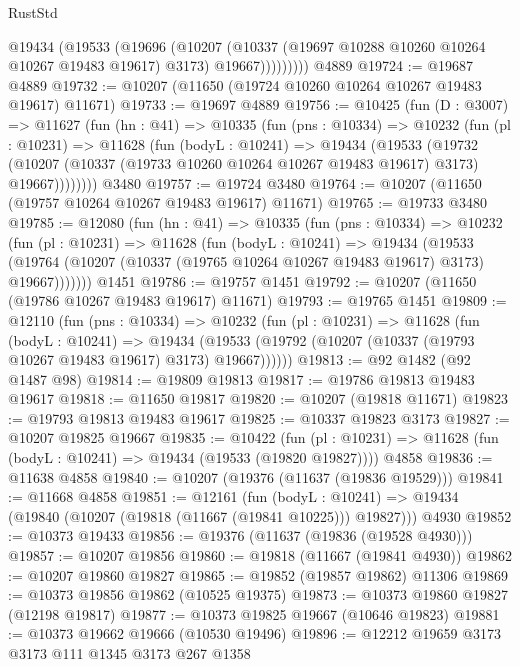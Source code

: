 \begin{lexlean}{RustStd}
\begin{coremodule}
              @19434
                (@19533
                  (@19696
                    (@10207
                      (@10337 (@19697 @10288 @10260 @10264 @10267 @19483 @19617) @3173)
                      @19667)))))))))
    @4889
@19724 := @19687 @4889
@19732 := @10207 (@11650 (@19724 @10260 @10264 @10267 @19483 @19617) @11671)
@19733 := @19697 @4889
@19756 := @10425
    (fun (D : @3007) =>
    @11627
      (fun (hn : @41) =>
      @10335
        (fun (pns : @10334) =>
        @10232
          (fun (pl : @10231) =>
          @11628
            (fun (bodyL : @10241) =>
            @19434
              (@19533
                (@19732
                  (@10207 (@10337 (@19733 @10260 @10264 @10267 @19483 @19617) @3173) @19667))))))))
    @3480
@19757 := @19724 @3480
@19764 := @10207 (@11650 (@19757 @10264 @10267 @19483 @19617) @11671)
@19765 := @19733 @3480
@19785 := @12080
    (fun (hn : @41) =>
    @10335
      (fun (pns : @10334) =>
      @10232
        (fun (pl : @10231) =>
        @11628
          (fun (bodyL : @10241) =>
          @19434
            (@19533
              (@19764 (@10207 (@10337 (@19765 @10264 @10267 @19483 @19617) @3173) @19667)))))))
    @1451
@19786 := @19757 @1451
@19792 := @10207 (@11650 (@19786 @10267 @19483 @19617) @11671)
@19793 := @19765 @1451
@19809 := @12110
    (fun (pns : @10334) =>
    @10232
      (fun (pl : @10231) =>
      @11628
        (fun (bodyL : @10241) =>
        @19434 (@19533 (@19792 (@10207 (@10337 (@19793 @10267 @19483 @19617) @3173) @19667))))))
@19813 := @92 @1482 (@92 @1487 @98)
@19814 := @19809 @19813
@19817 := @19786 @19813 @19483 @19617
@19818 := @11650 @19817
@19820 := @10207 (@19818 @11671)
@19823 := @19793 @19813 @19483 @19617
@19825 := @10337 @19823 @3173
@19827 := @10207 @19825 @19667
@19835 := @10422
    (fun (pl : @10231) => @11628 (fun (bodyL : @10241) => @19434 (@19533 (@19820 @19827))))
    @4858
@19836 := @11638 @4858
@19840 := @10207 (@19376 (@11637 (@19836 @19529)))
@19841 := @11668 @4858
@19851 := @12161
    (fun (bodyL : @10241) => @19434 (@19840 (@10207 (@19818 (@11667 (@19841 @10225))) @19827)))
    @4930
@19852 := @10373 @19433
@19856 := @19376 (@11637 (@19836 (@19528 @4930)))
@19857 := @10207 @19856
@19860 := @19818 (@11667 (@19841 @4930))
@19862 := @10207 @19860 @19827
@19865 := @19852 (@19857 @19862) @11306
@19869 := @10373 @19856 @19862 (@10525 @19375)
@19873 := @10373 @19860 @19827 (@12198 @19817)
@19877 := @10373 @19825 @19667 (@10646 @19823)
@19881 := @10373 @19662 @19666 (@10530 @19496)
@19896 := @12212
    @19659
    @3173
    @3173
    @111
    @1345
    @3173
    @267
    @1358

\end{coremodule}
\end{lexlean}
